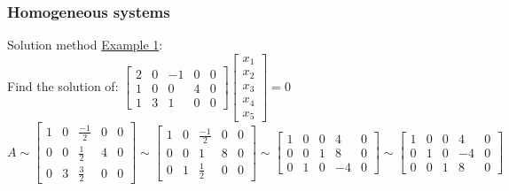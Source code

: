 \begin{frame}
	\frametitle{Homogeneous systems}
	\begin{block}{Solution method}
		\underline{Example 1}:\\
		Find the solution of: $\begin{bmatrix} 
		2 & 0 & -1 & 0 & 0\\
		1 & 0 & 0 & 4 & 0\\
		1 & 3 & 1 & 0 & 0
		\end{bmatrix} 
		\begin{bmatrix}
		x_1\\ x_2\\ x_3\\ x_4\\ x_5
		\end{bmatrix}=0$\\
		$A\sim\begin{bmatrix}
		1 & 0 & \frac{-1}{2} & 0 & 0\\
		0 & 0 & \frac{1}{2} & 4 & 0\\
		0 & 3 & \frac{3}{2} & 0 & 0
		\end{bmatrix} \sim \begin{bmatrix}
		1 & 0 & \frac{-1}{2} & 0 & 0\\
		0 & 0 & 1 & 8 & 0\\
		0 & 1 & \frac{1}{2} & 0 & 0
		\end{bmatrix} \sim \begin{bmatrix}
		1 & 0 & 0 & 4 & 0\\
		0 & 0 & 1 & 8 & 0\\
		0 & 1 & 0 & -4 & 0
		\end{bmatrix}\sim\begin{bmatrix}
		1 & 0 & 0 & 4 & 0\\
		0 & 1 & 0 & -4 & 0\\
		0 & 0 & 1 & 8 & 0
		\end{bmatrix}$
	\end{block}
\end{frame}

